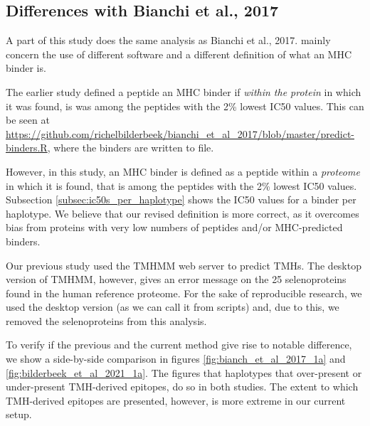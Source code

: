 \subsection{Differences with Bianchi et al., 2017}

A part of this study does the same analysis as Bianchi et al., 2017.
mainly concern the use of different
software and a different definition of what an MHC binder is.


The earlier study defined a peptide an MHC binder 
if \emph{within the protein} in which it was found, 
is was among the peptides with the 2\% lowest IC50 values.
This can be seen at \url{https://github.com/richelbilderbeek/bianchi_et_al_2017/blob/master/predict-binders.R},
where the binders are written to file.

However, in this study, an MHC binder is defined as a peptide within a \emph{proteome} in which it is found, that is among the peptides with the 2\% lowest IC50 values.
Subsection \ref{subsec:ic50s_per_haplotype} shows the IC50 values
for a binder per haplotype. We believe that our revised definition is more correct, as it overcomes bias from proteins with very low numbers of peptides and/or MHC-predicted binders.


Our previous study used the TMHMM web server
to predict TMHs.
The desktop version of TMHMM, however, gives an
error message on the 25 selenoproteins found in the human
reference proteome.
For the sake of reproducible research, we used the desktop version (as
we can call it from scripts) and, due to this, we removed the
selenoproteins from this analysis.


To verify if the previous and the current method give rise to
notable difference, we show a side-by-side comparison
in figures \ref{fig:bianch_et_al_2017_1a} and \ref{fig:bilderbeek_et_al_2021_1a}.
The figures that haplotypes that over-present or under-present TMH-derived epitopes,
do so in both studies. The extent to which TMH-derived epitopes are
presented, however, is more extreme in our current setup.

